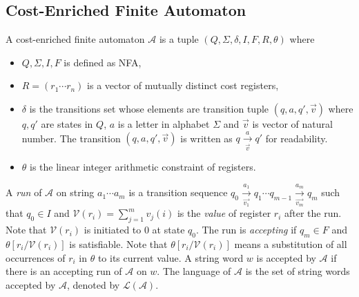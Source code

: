 \documentclass[runningheads]{llncs}
\newcommand*{\myvec}[1]{\vec{#1}}
\newcommand*{\lan}{\mathcal{L}}
\newcommand*{\aut}{\mathcal{A}}
\begin{document}
\subsection{Cost-Enriched Finite Automaton}
\begin{definition}
  A cost-enriched finite automaton $\aut$ is a tuple $(Q, \Sigma, \delta, I, F, R, \theta)$ where
  \begin{itemize}
    \item $Q,\Sigma,I,F$ is defined as NFA,
    \item $R = (r_1\cdots r_n)$ is a vector of mutually distinct cost registers,
    \item $\delta$ is the transitions set whose elements are transition tuple $(q, a, q', \myvec{v})$ where $q, q'$ are states in $Q$, $a$ is a letter in alphabet $\Sigma$ and $\myvec{v}$ is vector of natural number. The transition $(q, a, q', \myvec{v})$ is written as $q\xrightarrow[\myvec{v}]{a} q'$ for readability.
    \item $\theta$ is the linear integer arithmetic constraint of registers.
  \end{itemize}
  A \emph{run} of $\aut$ on string $a_1\cdots a_m$ is a transition sequence $q_0\xrightarrow[\myvec{v_1}]{a_1}q_1\cdots q_{m-1}\xrightarrow[\myvec{v_m}]{a_m}q_m$ such that $q_0\in I$ and $\mathcal{V}(r_i) = \displaystyle\sum_{j=1}^m v_j(i)$ is the \emph{value} of register $r_i$ after the run. Note that $\mathcal{V}(r_i)$ is initiated to 0 at state $q_0$. The run is \emph{accepting} if $q_m\in F$ and $\theta[r_i/\mathcal{V}(r_i)]$ is satisfiable. Note that $\theta[r_i/\mathcal{V}(r_i)]$ means a substitution of all occurrences of $r_i$ in $\theta$ to its current value. A string word $w$ is accepted by $\aut$ if there is an accepting run of $\aut$ on $w$. The language of $\aut$ is the set of string words accepted by $\aut$, denoted by $\lan(\aut)$. 
\end{definition}
\end{document}
